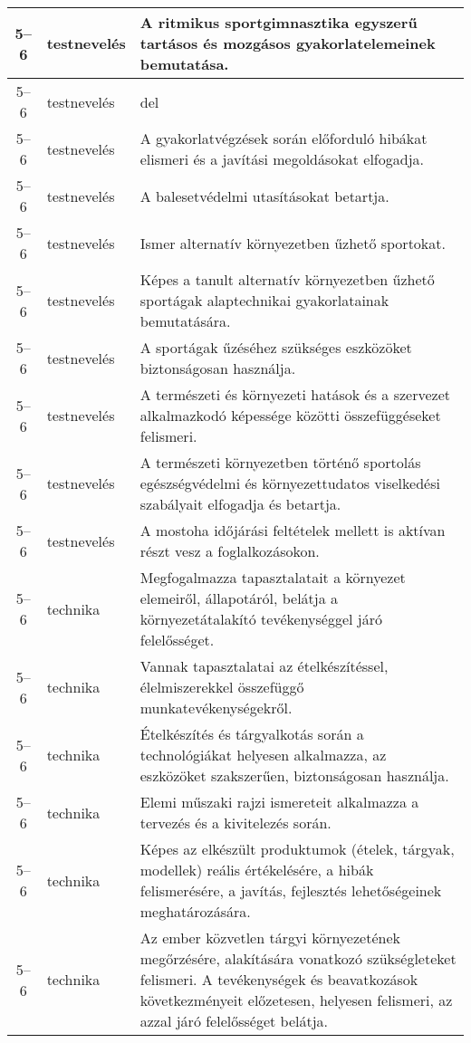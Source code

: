 \begin{small}
\begin{longtable}{c | p{2cm} |  p{11cm} }
              5--6 & testnevelés & A ritmikus sportgimnasztika egyszerű tartásos és mozgásos gyakorlatelemeinek bemutatása. \\ \hline
              5--6 & testnevelés & del
 \\ \hline
              5--6 & testnevelés & A gyakorlatvégzések során előforduló hibákat elismeri és a javítási megoldásokat elfogadja. \\ \hline
              5--6 & testnevelés & A balesetvédelmi utasításokat betartja. \\ \hline
              5--6 & testnevelés & Ismer alternatív környezetben űzhető sportokat. \\ \hline
              5--6 & testnevelés & Képes a tanult alternatív környezetben űzhető sportágak alaptechnikai gyakorlatainak bemutatására. \\ \hline
              5--6 & testnevelés & A sportágak űzéséhez szükséges eszközöket biztonságosan használja. \\ \hline
              5--6 & testnevelés & A természeti és környezeti hatások és a szervezet alkalmazkodó képessége közötti összefüggéseket felismeri. \\ \hline
              5--6 & testnevelés & A természeti környezetben történő sportolás egészségvédelmi és környezettudatos viselkedési szabályait elfogadja és betartja. \\ \hline
              5--6 & testnevelés & A mostoha időjárási feltételek mellett is aktívan részt vesz a foglalkozásokon. \\ \hline
              5--6 & technika & Megfogalmazza tapasztalatait a környezet elemeiről, állapotáról, belátja a környezetátalakító tevékenységgel járó felelősséget. \\ \hline
              5--6 & technika & Vannak tapasztalatai az ételkészítéssel, élelmiszerekkel összefüggő munkatevékenységekről. \\ \hline
              5--6 & technika & Ételkészítés és tárgyalkotás során a technológiákat helyesen alkalmazza, az eszközöket szakszerűen, biztonságosan használja. \\ \hline
              5--6 & technika & Elemi műszaki rajzi ismereteit alkalmazza a tervezés és a kivitelezés során. \\ \hline
              5--6 & technika & Képes az elkészült produktumok (ételek, tárgyak, modellek) reális értékelésére, a hibák felismerésére, a javítás, fejlesztés lehetőségeinek meghatározására. \\ \hline
              5--6 & technika & Az ember közvetlen tárgyi környezetének megőrzésére, alakítására vonatkozó szükségleteket felismeri. A tevékenységek és beavatkozások következményeit előzetesen, helyesen felismeri, az azzal járó felelősséget belátja. \\ \hline

\end{longtable}
\end{small}
